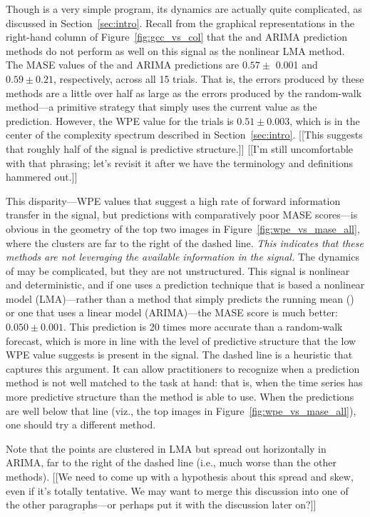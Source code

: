 Though \col is a very simple program, its dynamics are actually quite
complicated, as discussed in Section~\ref{sec:intro}.  Recall from the
graphical representations in the right-hand column of
Figure~\ref{fig:gcc_vs_col} that the \naive and ARIMA prediction
methods do not perform as well on this signal as the nonlinear LMA
method.  The MASE values of the \naive and ARIMA predictions are $0.57
\pm$ 0.001 and $0.59 \pm 0.21$, respectively, across all 15 trials.
That is, the errors produced by these methods are a little over half
as large as the errors produced by the random-walk method---a
primitive strategy that simply uses the current value as the
prediction.  However, the WPE value for the \col trials is $0.51 \pm
0.003$, which is in the center of the complexity spectrum described in
Section~\ref{sec:intro}.  [[This suggests that roughly half of the
    signal is predictive structure.]]  [[I'm still uncomfortable with
    that phrasing; let's revisit it after we have the terminology and
    definitions hammered out.]]  

This disparity---WPE values that suggest a high rate of forward
information transfer in the signal, but predictions with comparatively
poor MASE scores---is obvious in the geometry of the top two images in
Figure~\ref{fig:wpe_vs_mase_all}, where the \col clusters are far to
the right of the dashed line.  {\sl This indicates that these methods
  are not leveraging the available information in the signal.}  The
dynamics of \col may be complicated, but they are not unstructured.
This signal is nonlinear and deterministic, and if one uses a
prediction technique that is based a nonlinear model (LMA)---rather
than a method that simply predicts the running mean (\naive) or one
that uses a linear model (ARIMA)---the MASE score is much better:
$0.050 \pm 0.001$.  This prediction is 20 times more accurate than a
random-walk forecast, which is more in line with the level of
predictive structure that the low WPE value suggests is present in the
signal.  The dashed line is a heuristic that captures this argument.
It can allow practitioners to recognize when a prediction method is
not well matched to the task at hand: that is, when the time series
has more predictive structure than the method is able to use.  When
the predictions are well below that line (viz., the top images in
Figure~\ref{fig:wpe_vs_mase_all}), one should try a different method.

Note that the \col points are clustered in LMA but spread out
horizontally in ARIMA, far to the right of the dashed line (i.e., much
worse than the other methods).  [[We need to come up with a hypothesis
    about this spread and skew, even if it's totally tentative.  We
    may want to merge this discussion into one of the other \col
    paragraphs---or perhaps put it with the \svdone discussion later
    on?]]

